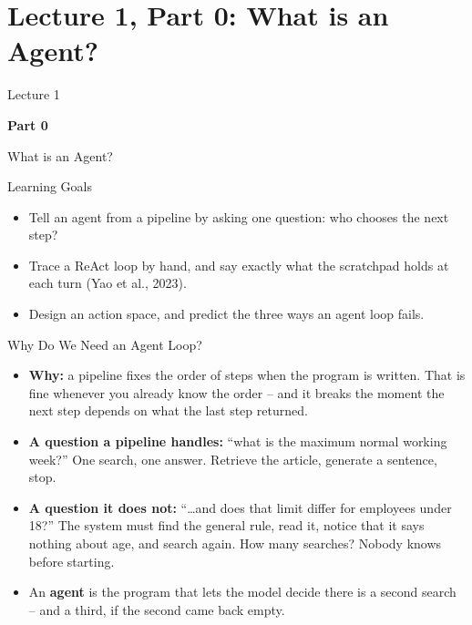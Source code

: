 \section{Lecture 1, Part 0: What is an Agent?}

\begin{frame}
\vfill
\centering
{\color{RLBlue}\large Lecture 1}

\vspace{0.3em}
{\color{RLBlue}\Large\bfseries Part 0}

\vspace{0.6em}
{\Large What is an Agent?}
\vfill
\end{frame}

\begin{frame}{Learning Goals}
\begin{itemize}
  \item Tell an agent from a pipeline by asking one question: who chooses the next step?
  \pause
  \item Trace a ReAct loop by hand, and say exactly what the scratchpad holds at each turn (Yao et al., 2023).
  \pause
  \item Design an action space, and predict the three ways an agent loop fails.
\end{itemize}
\end{frame}

\begin{frame}{Why Do We Need an Agent Loop?}
\begin{itemize}
  \item \textbf{Why:} a pipeline fixes the order of steps when the program is written. That is fine whenever you already know the order -- and it breaks the moment the next step depends on what the last step returned.
  \pause
  \item \textbf{A question a pipeline handles:} ``what is the maximum normal working week?'' One search, one answer. Retrieve the article, generate a sentence, stop.
  \pause
  \item \textbf{A question it does not:} ``\dots and does that limit differ for employees under 18?'' The system must find the general rule, read it, notice that it says nothing about age, and search again. How many searches? Nobody knows before starting.
  \pause
  \item An \textbf{agent} is the program that lets the model decide there is a second search -- and a third, if the second came back empty.
\end{itemize}
\end{frame}

